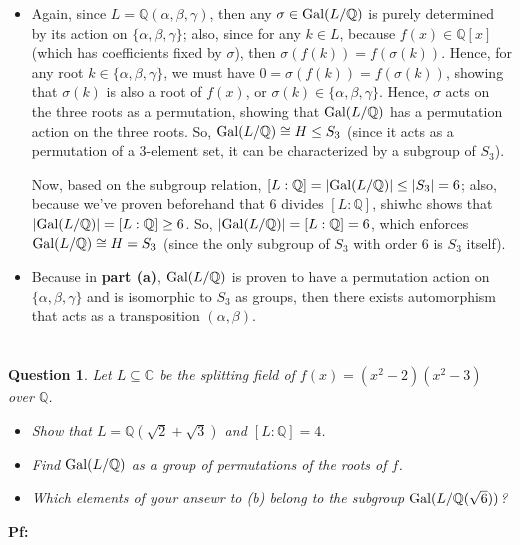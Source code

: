 \documentclass{article}
\newtheorem{question}{Question}
\newcommand{\QQ}{\mathbb{Q}}
\newcommand{\CC}{\mathbb{C}}
\newcommand{\Gal}{\textmd{Gal}}
\begin{document}
\begin{itemize}
    \item[(a)] Again, since $L=\QQ(\alpha,\beta,\gamma)$, then any $\sigma\in \Gal(L/\QQ)$ is purely determined by its action on $\{\alpha,\beta,\gamma\}$; also, since for any $k\in L$, because $f(x)\in \QQ[x]$ (which has coefficients fixed by $\sigma$), then $\sigma(f(k))=f(\sigma(k))$. Hence, for any root $k\in\{\alpha,\beta,\gamma\}$, we must have $0=\sigma(f(k))=f(\sigma(k))$, showing that $\sigma(k)$ is also a root of $f(x)$, or $\sigma(k)\in\{\alpha,\beta,\gamma\}$. Hence, $\sigma$ acts on the three roots as a permutation, showing that $\Gal(L/\QQ)$ has a permutation action on the three roots. So, $\Gal(L/\QQ)\cong H\leq S_3$ (since it acts as a permutation of a $3$-element set, it can be characterized by a subgroup of $S_3$).
    
    Now, based on the subgroup relation, $[L:\QQ]=|\Gal(L/\QQ)| \leq |S_3| = 6$; also, because we've proven beforehand that $6$ divides $[L:\QQ]$, shiwhc shows that $|\Gal(L/\QQ)|=[L:\QQ]\geq 6$. So, $|\Gal(L/\QQ)| = [L:\QQ]=6$, which enforces $\Gal(L/\QQ)\cong H=S_3$ (since the only subgroup of $S_3$ with order $6$ is $S_3$ itself).
    \item[(b)] Because in \textbf{part (a)}, $\Gal(L/\QQ)$ is proven to have a permutation action on $\{\alpha,\beta,\gamma\}$ and is isomorphic to $S_3$ as groups, then there exists automorphism that acts as a transposition $(\alpha,\beta)$.
\end{itemize}

\break

\section{}%
\begin{question}\label{q4}
    Let $L\subseteq \CC$ be the splitting field of $f(x)=(x^2-2)(x^2-3)$ over $\QQ$.
    \begin{itemize}
        \item[(a)] Show that $L=\QQ(\sqrt{2}+\sqrt{3})$ and $[L:\QQ]=4$.
        \item[(b)] Find $\Gal(L/\QQ)$ as a group of permutations of the roots of $f$.
        \item[(c)] Which elements of your ansewr to (b) belong to the subgroup $\Gal(L/\QQ(\sqrt{6}))$?  
    \end{itemize}
\end{question}

\textbf{Pf:}
\end{document}
